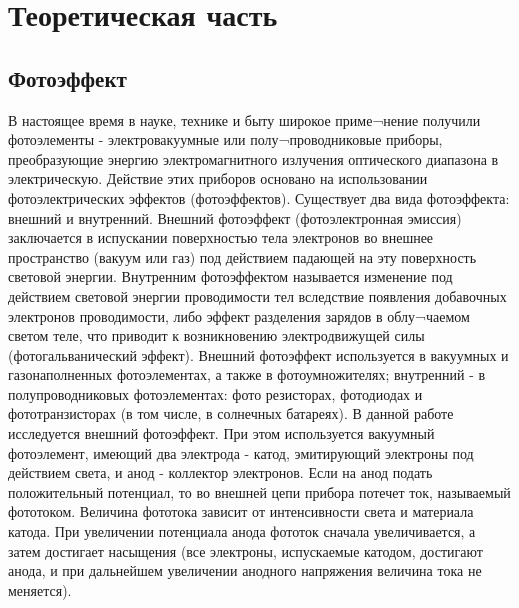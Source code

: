 



\def\labauthors{Сарафанов Ф.Г., Понур К.А., Сидоров Д. Батькович}
\def\labgroup{430}
\def\labnumber{1}
\def\labtheme{Исследование фотоэффекта и измерение постоянной Планка}
\renewcommand{\vec}{\mathbf}
\renewcommand{\Re}{\operatorname{Re}}
\renewcommand{\Im}{\operatorname{Im}}
\renewcommand{\phi}{\varphi}
\renewcommand{\hat}{\widehat}



\tableofcontents
\newpage

\section{Теоретическая часть}
\subsection*{Фотоэффект}
В настоящее время в науке, технике и быту широкое приме¬нение получили фотоэлементы - электровакуумные или полу¬проводниковые приборы, преобразующие энергию электромагнитного излучения оптического диапазона в электрическую. Действие этих приборов основано на использовании фотоэлектрических эффектов (фотоэффектов). 
Существует два вида фотоэффекта: внешний и внутренний. Внешний фотоэффект (фотоэлектронная эмиссия) заключается в испускании поверхностью тела электронов во внешнее пространство (вакуум или газ) под действием падающей на эту поверхность световой энергии. Внутренним фотоэффектом называется изменение под действием световой энергии проводимости тел вследствие появления добавочных электронов проводимости, либо эффект разделения зарядов в облу¬чаемом светом теле, что приводит к возникновению электродвижущей силы (фотогальванический эффект). Внешний фотоэффект используется в вакуумных и газонаполненных фотоэлементах, а также в фотоумножителях; внутренний - в полупроводниковых фотоэлементах: фото резисторах, фотодиодах и фототранзисторах (в том числе, в солнечных батареях).
В данной работе исследуется внешний фотоэффект. При этом используется вакуумный фотоэлемент, имеющий два электрода - катод, эмитирующий электроны под действием света, и анод - коллектор электронов. Если на анод подать положительный потенциал, то во внешней цепи прибора потечет ток, называемый фототоком. Величина фототока зависит от интенсивности света и материала катода. При увеличении потенциала анода фототок сначала увеличивается, а затем достигает насыщения (все электроны, испускаемые катодом, достигают анода, и при дальнейшем увеличении анодного напряжения величина тока не меняется).
